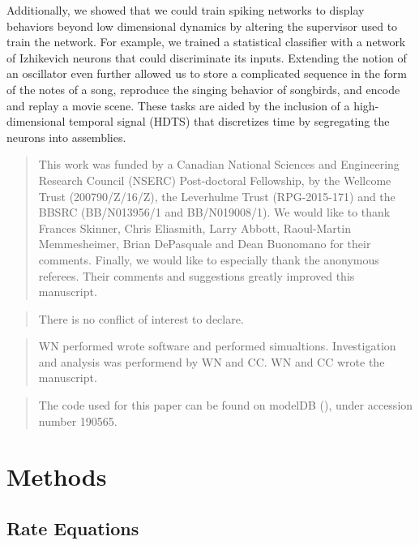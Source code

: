 \documentclass[11pt]{article} %
\begin{document}
Additionally, we showed that we could train spiking networks to display behaviors 
beyond low dimensional dynamics by altering the supervisor used to train the network.  
For example, we trained a statistical classifier with a network of Izhikevich neurons 
that could discriminate its inputs.  
Extending the notion of an oscillator even further allowed us to store a complicated 
sequence in the form of the notes of a song, reproduce the singing behavior of songbirds, 
and encode and replay a movie scene. 
These tasks are aided by the inclusion of a high-dimensional temporal signal (HDTS) 
that discretizes time by segregating the neurons into assemblies.  
 



\renewcommand{\abstractname}{Acknowledgements}
\begin{abstract}
This work was funded by a Canadian National Sciences and 
Engineering Research Council (NSERC) Post-doctoral Fellowship, 
by the Wellcome Trust (200790/Z/16/Z), the Leverhulme Trust (RPG-2015-171) 
and the BBSRC (BB/N013956/1 and BB/N019008/1).  
We would like to thank Frances Skinner, Chris Eliasmith, Larry Abbott, 
Raoul-Martin Memmesheimer, Brian DePasquale and Dean Buonomano for their comments.  
Finally, we would like to especially thank the anonymous referees.  
Their comments and suggestions greatly improved this manuscript. 
\end{abstract}

\renewcommand{\abstractname}{Conflict of Interest} 
\begin{abstract}
There is no conflict of interest to declare.   
\end{abstract}

\renewcommand{\abstractname}{Author Contributions}
\begin{abstract}
WN performed wrote software and performed simualtions.  
Investigation and analysis was performend by WN and CC.  
WN and CC wrote the manuscript.   
\end{abstract}


\renewcommand{\abstractname}{Data Availability Statement}
\begin{abstract}
The code used for this paper can be found on modelDB (\cite{modeldb}), 
under accession number 190565.
\end{abstract}

\section*{Methods} 
\subsection*{Rate Equations} 
\end{document}
